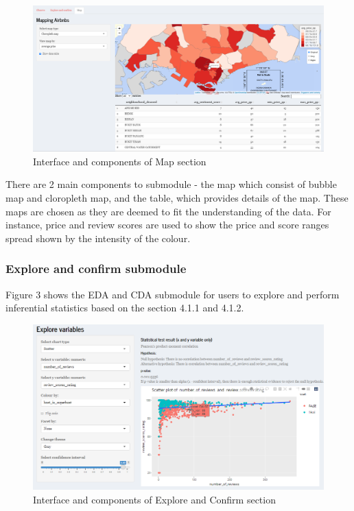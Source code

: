 \documentclass{acm_proc_article-sp}
\begin{document}
\begin{figure}[H]

{\centering \includegraphics[width=1\linewidth]{images/design_map} 

}

\caption{Interface and components of Map section}\label{fig:unnamed-chunk-2}
\end{figure}

There are 2 main components to submodule - the map which consist of
bubble map and cloropleth map, and the table, which provides details of
the map. These maps are chosen as they are deemed to fit the
understanding of the data. For instance, price and review scores are
used to show the price and score ranges spread shown by the intensity of
the colour.

\hypertarget{explore-and-confirm-submodule}{%
\subsubsection{Explore and confirm
submodule}\label{explore-and-confirm-submodule}}

Figure 3 shows the EDA and CDA submodule for users to explore and
perform inferential statistics based on the section 4.1.1 and 4.1.2.

\begin{figure}[H]

{\centering \includegraphics[width=1\linewidth]{images/design_explore1} 

}

\caption{Interface and components of Explore and Confirm section}\label{fig:unnamed-chunk-3}
\end{figure}
\end{document}
